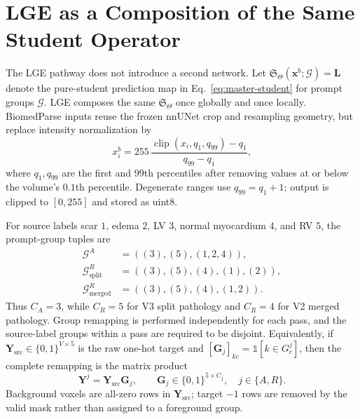 \documentclass[10pt]{article}
\newcommand{\cG}{\mathcal{G}}
\newcommand{\clip}{\operatorname{clip}}
\newcommand{\ind}{\mathbb{1}}
\begin{document}
\section{LGE as a Composition of the Same Student Operator}

The LGE pathway does not introduce a second network.  Let
$\mathfrak S_\Theta(\bm x^b;\cG)=\bm L$ denote the pure-student prediction map
in Eq.~\eqref{eq:master-student} for prompt groups $\cG$.  LGE composes the
same $\mathfrak S_\Theta$ once globally and once locally.  BiomedParse inputs reuse
the frozen nnUNet crop and resampling geometry, but replace intensity
normalization by
\begin{equation}
 x_i^b=255\,
 \frac{\clip(x_i,q_1,q_{99})-q_1}{q_{99}-q_1},
 \label{eq:lge-normalization}
\end{equation}
where $q_1,q_{99}$ are the first and $99$th percentiles after removing values at
or below the volume's $0.1$th percentile.  Degenerate ranges use
$q_{99}=q_1+1$; output is clipped to $[0,255]$ and stored as uint8.

For source labels scar $1$, edema $2$, LV $3$, normal myocardium $4$, and RV
$5$, the prompt-group tuples are
\begin{equation}
\begin{aligned}
 \cG^A&=((3),(5),(1,2,4)),\\
 \cG^R_{\mathrm{split}}&=((3),(5),(4),(1),(2)),\\
 \cG^R_{\mathrm{merged}}&=((3),(5),(4),(1,2)).
\end{aligned}
\label{eq:lge-groups}
\end{equation}
Thus $C_A=3$, while $C_R=5$ for V3 split pathology and $C_R=4$ for V2 merged
pathology.  Group remapping is performed independently for each pass, and the
source-label groups within a pass are required to be disjoint.  Equivalently,
if $\bm Y_{\mathrm{src}}\in\{0,1\}^{V\times5}$ is the raw one-hot target and
$[\bm G_j]_{kc}=\ind[k\in G_c^j]$, then the complete remapping is the matrix
product
\begin{equation}
    \bm Y^j=\bm Y_{\mathrm{src}}\bm G_j,
    \qquad \bm G_j\in\{0,1\}^{5\times C_j},\quad j\in\{A,R\}.
\end{equation}
Background voxels are all-zero rows in $\bm Y_{\mathrm{src}}$; target $-1$
rows are removed by the valid mask rather than assigned to a foreground group.
\end{document}
